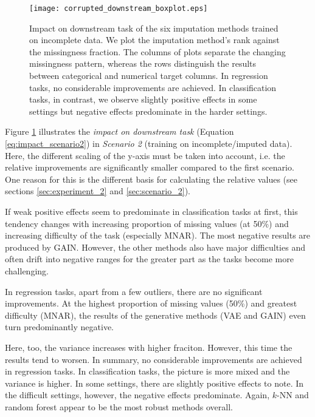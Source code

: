 \begin{figure}\centering
	\texttt{[image: corrupted\_downstream\_boxplot.eps]}

	\caption[Downstream Ranks - Corrupted]{Impact on downstream task of the six imputation methods trained on incomplete data. We plot the imputation method's rank against the missingness fraction. The columns of plots separate the changing missingness pattern, whereas the rows distinguish the results between categorical and numerical target columns. In regression tasks, no considerable improvements are achieved. In classification tasks, in contrast, we observe slightly positive effects in some settings but negative effects predominate in the harder settings.
    }
	\label{fig:corrupted_downstream_boxplot}
\end{figure}

Figure \ref{fig:corrupted_downstream_boxplot} illustrates the \textit{impact on downstream task} (Equation \ref{eq:impact_scenario2}) in \textit{Scenario 2} (training on incomplete/imputed data). Here, the different scaling of the y-axis must be taken into account, i.e. the relative improvements are significantly smaller compared to the first scenario. One reason for this is the different basis for calculating the relative values (see sections \ref{sec:experiment_2} and \ref{sec:scenario_2}).

If weak positive effects seem to predominate in classification tasks at first, this tendency changes with increasing proportion of missing values (at 50\%) and increasing difficulty of the task (especially MNAR). The most negative results are produced by GAIN. However, the other methods also have major difficulties and often drift into negative ranges for the greater part as the tasks become more challenging.

In regression tasks, apart from a few outliers, there are no significant improvements. At the highest proportion of missing values (50\%) and greatest difficulty (MNAR), the results of the generative methods (VAE and GAIN) even turn predominantly negative.

Here, too, the variance increases with higher fraciton. However, this time the results tend to worsen. In summary, no considerable improvements are achieved in regression tasks. In classification tasks, the picture is more mixed and the variance is higher. In some settings, there are slightly positive effects to note. In the difficult settings, however, the negative effects predominate. Again, $k$-NN and random forest appear to be the most robust methods overall.

